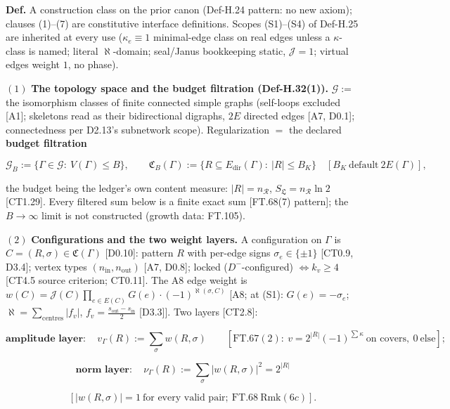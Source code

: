 \begin{definition}\label{tag:Def-H-32}
\textbf{Def.} A construction class on the prior canon (Def-H.24 pattern: no new axiom); clauses (1)–(7) are constitutive interface definitions. Scopes (S1)–(S4) of Def-H.25 are inherited at every use ($\kappa_e\equiv1$ minimal-edge class on real edges unless a $\kappa$-class is named; literal $\aleph$-domain; seal/Janus bookkeeping static, $\mathcal J=1$; virtual edges weight $1$, no phase).

$(1)$ \textbf{The topology space and the budget filtration (Def-H.32(1)).} $\mathcal G:=$ the isomorphism classes of finite connected simple graphs (self-loops excluded [A1]; skeletons read as their bidirectional digraphs, $2E$ directed edges [A7, D0.1]; connectedness per D2.13's subnetwork scope). Regularization $=$ the declared \textbf{budget filtration}

\[
\mathcal G_B:=\{\Gamma\in\mathcal G:\ V(\Gamma)\le B\},\qquad
\mathfrak C_B(\Gamma):=\{R\subseteq E_{\mathrm{dir}}(\Gamma):\ |R|\le B_K\}\quad[B_K\ \text{default}\ 2E(\Gamma)],
\]

the budget being the ledger's own content measure: $|R|=n_{\mathcal R}$, $S_{\mathfrak L}=n_{\mathcal R}\ln2$ [CT1.29]. Every filtered sum below is a finite exact sum [FT.68(7) pattern]; the $B\to\infty$ limit is not constructed (growth data: FT.105).

$(2)$ \textbf{Configurations and the two weight layers.} A configuration on $\Gamma$ is $C=(R,\sigma)\in\mathfrak C(\Gamma)$ [D0.10]: pattern $R$ with per-edge signs $\sigma_e\in\{\pm1\}$ [CT0.9, D3.4]; vertex types $(n_{\mathrm{in}},n_{\mathrm{out}})$ [A7, D0.8]; locked ($D^-$-configured) $\iff k_v\ge4$ [CT4.5 source criterion; CT0.11]. The A8 edge weight is $w(C)=\mathcal J(C)\prod_{e\in E(C)}G(e)\cdot(-1)^{\aleph(\sigma,C)}$ [A8; at (S1): $G(e)=-\sigma_e$; $\aleph=\sum_{\text{centres}}|f_v|$, $f_v=\tfrac{s_{\mathrm{out}}-s_{\mathrm{in}}}2$ [D3.3]]. Two layers [CT2.8]:

\[
\textbf{amplitude layer}:\quad v_\Gamma(R):=\sum_\sigma w(R,\sigma)\qquad[\mathrm{FT.67}(2):\ v=2^{|R|}(-1)^{\sum\kappa}\ \text{on covers},\ 0\ \text{else}];
\]

\[
\textbf{norm layer}:\quad \nu_\Gamma(R):=\sum_\sigma|w(R,\sigma)|^2=2^{|R|}
\]

\[
\qquad [|w(R,\sigma)|=1\ \text{for every valid pair};\ \mathrm{FT.68}\ \text{Rmk}(6c)].
\]


\end{definition}
